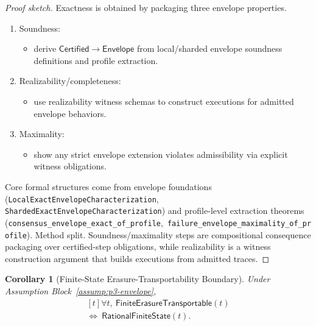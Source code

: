 \documentclass[a4paper,10pt,twocolumn,english]{article}
\numberwithin{equation}{section}
\theoremstyle{paperdef}
\theoremstyle{paperplain}
\newtheorem{corollary}[definition]{Corollary}
\theoremstyle{paperdef}
\theoremstyle{paperremark}
\theoremstyle{paperdef}
\begin{document}
\begin{proof}[Proof sketch]
	Exactness is obtained by packaging three envelope properties.

	\begin{enumerate}
		\item Soundness:
		      \begin{itemize}
			      \item derive $\mathsf{Certified} \to \mathsf{Envelope}$ from local/sharded envelope soundness definitions and profile extraction.
		      \end{itemize}
		\item Realizability/completeness:
		      \begin{itemize}
			      \item use realizability witness schemas to construct executions for admitted envelope behaviors.
		      \end{itemize}
		\item Maximality:
		      \begin{itemize}
			      \item show any strict envelope extension violates admissibility via explicit witness obligations.
		      \end{itemize}
	\end{enumerate}

	Core formal structures come from envelope foundations (\texttt{LocalExactEnvelopeCharacterization}, \texttt{ShardedExactEnvelopeCharacterization}) and profile-level extraction theorems (\nolinkurl{consensus_envelope_exact_of_profile},\allowbreak\ \nolinkurl{failure_envelope_maximality_of_profile}).
	Method split. Soundness/maximality steps are compositional consequence
	packaging over certified-step obligations, while realizability is a witness
	construction argument that builds executions from admitted traces.
\end{proof}

\begin{corollary}[Finite-State Erasure-Transportability Boundary]
	\label{cor:transportability}
	Under Assumption Block~\ref{assump:p3-envelope},
	\begin{equation}
		\begin{aligned}[t]
			\forall t,\ \mathsf{FiniteErasureTransportable}(t)
			\\
			\iff\ \mathsf{RationalFiniteState}(t).
		\end{aligned}
	\end{equation}
\end{corollary}
\end{document}
